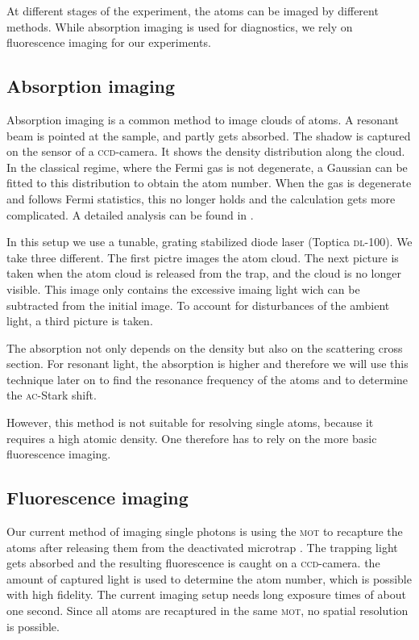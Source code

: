 At different stages of the experiment, the atoms can be imaged by different methods. While absorption imaging is used for diagnostics, we rely on fluorescence imaging for our experiments.

\subsection{Absorption imaging}

Absorption imaging is a common method to image clouds of atoms\cite{ketterle}. A resonant beam is pointed at the sample, and partly gets absorbed. The shadow is captured on the sensor of a \textsc{ccd}-camera. It shows the density distribution along the cloud. In the classical regime, where the Fermi gas is not degenerate, a Gaussian can be fitted to this distribution to obtain the atom number. When the gas is degenerate and follows Fermi statistics, this no longer holds and the calculation gets more complicated. A detailed analysis can be found in \cite{ketterle2}.

In this setup we use a tunable, grating stabilized diode laser (Toptica \textsc{dl}-100). We take three different. The first pictre images the atom cloud. The next picture is taken when the atom cloud is released from the trap, and the cloud is no longer visible. This image only contains the excessive imaing light wich can be subtracted from the initial image. To account for disturbances of the ambient light, a third picture is taken.

The absorption not only depends on the density but also on the scattering cross section. For resonant light, the absorption is higher and therefore we will use this technique later on to find the resonance frequency of the atoms and to determine the \textsc{ac}-Stark shift.

However, this method is not suitable for resolving single atoms, because it requires a high atomic density. One therefore has to rely on the more basic fluorescence imaging.

\subsection{Fluorescence imaging}

Our current method of imaging single photons is using the \textsc{mot} to recapture the atoms after releasing them from the deactivated microtrap \cite{timo}. The trapping light gets absorbed and the resulting fluorescence is caught on a \textsc{ccd}-camera. the amount of captured light is used to determine the atom number, which is possible with high fidelity. The current imaging setup needs long exposure times of about one second. Since all atoms are recaptured in the same \textsc{mot}, no spatial resolution is possible.

